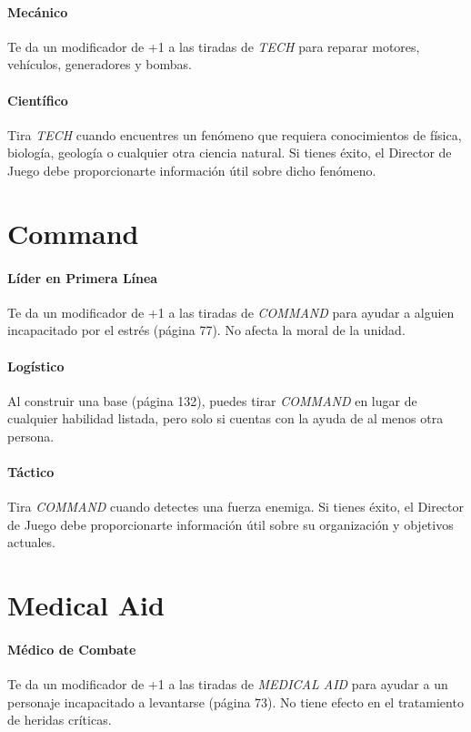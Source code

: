     \paragraph{Mecánico}
    Te da un modificador de +1 a las tiradas de \emph{TECH} para reparar motores, vehículos, generadores y bombas.

    \paragraph{Científico}
    Tira \emph{TECH} cuando encuentres un fenómeno que requiera conocimientos de física, biología, geología o cualquier otra ciencia natural. Si tienes éxito, el Director de Juego debe proporcionarte información útil sobre dicho fenómeno.

\section{Command}

    \paragraph{Líder en Primera Línea}
    Te da un modificador de +1 a las tiradas de \emph{COMMAND} para ayudar a alguien incapacitado por el estrés (página 77). No afecta la moral de la unidad.

    \paragraph{Logístico}
    Al construir una base (página 132), puedes tirar \emph{COMMAND} en lugar de cualquier habilidad listada, pero solo si cuentas con la ayuda de al menos otra persona.

    \paragraph{Táctico}
    Tira \emph{COMMAND} cuando detectes una fuerza enemiga. Si tienes éxito, el Director de Juego debe proporcionarte información útil sobre su organización y objetivos actuales.

\section{Medical Aid}

    \paragraph{Médico de Combate}
    Te da un modificador de +1 a las tiradas de \emph{MEDICAL AID} para ayudar a un personaje incapacitado a levantarse (página 73). No tiene efecto en el tratamiento de heridas críticas.

